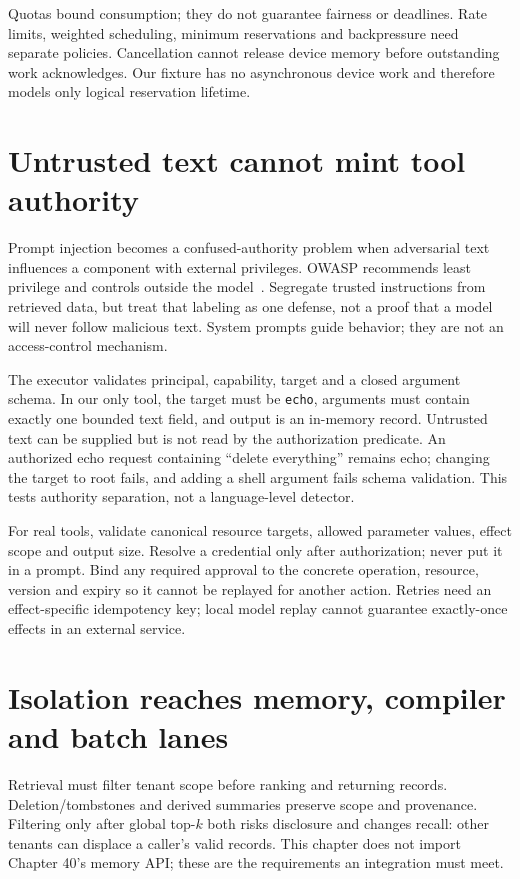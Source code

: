 
Quotas bound consumption; they do not guarantee fairness or deadlines.
Rate limits, weighted scheduling, minimum reservations and backpressure need
separate policies. Cancellation cannot release device memory before outstanding
work acknowledges. Our fixture has no asynchronous device work and therefore
models only logical reservation lifetime.

\section{Untrusted text cannot mint tool authority}
\label{evod45:tools}
Prompt injection becomes a confused-authority problem when adversarial text
influences a component with external privileges. OWASP recommends least
privilege and controls outside the model~\cite{injection45,boundary45}.
Segregate trusted instructions from retrieved data, but treat that labeling as
one defense, not a proof that a model will never follow malicious text.
System prompts guide behavior; they are not an access-control mechanism.

The executor validates principal, capability, target and a closed argument
schema. In our only tool, the target must be \texttt{echo}, arguments must
contain exactly one bounded text field, and output is an in-memory record.
Untrusted text can be supplied but is not read by the authorization predicate.
An authorized echo request containing ``delete everything'' remains echo;
changing the target to root fails, and adding a shell argument fails schema
validation. This tests authority separation, not a language-level detector.

For real tools, validate canonical resource targets, allowed parameter values,
effect scope and output size. Resolve a credential only after authorization;
never put it in a prompt. Bind any required approval to the concrete operation,
resource, version and expiry so it cannot be replayed for another action.
Retries need an effect-specific idempotency key; local model replay cannot
guarantee exactly-once effects in an external service.

\section{Isolation reaches memory, compiler and batch lanes}
\label{evod45:engines}
Retrieval must filter tenant scope before ranking and returning records.
Deletion/tombstones and derived summaries preserve scope and provenance.
Filtering only after global top-$k$ both risks disclosure and changes recall:
other tenants can displace a caller's valid records. This chapter does not import
Chapter 40's memory API; these are the requirements an integration must meet.

